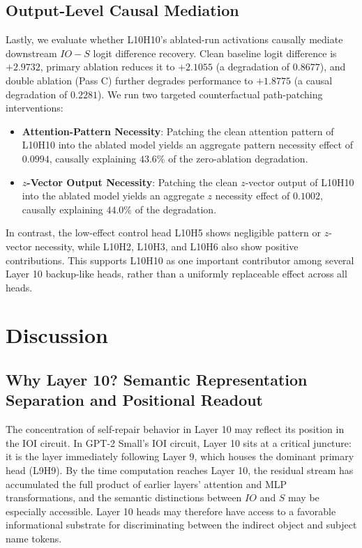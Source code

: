 \documentclass[10pt]{article} %
\begin{document}
\subsection{Output-Level Causal Mediation}
Lastly, we evaluate whether L10H10's ablated-run activations causally mediate downstream $IO - S$ logit difference recovery. Clean baseline logit difference is $+2.9732$, primary ablation reduces it to $+2.1055$ (a degradation of $0.8677$), and double ablation (Pass C) further degrades performance to $+1.8775$ (a causal degradation of $0.2281$).
We run two targeted counterfactual path-patching interventions:
\begin{itemize}
  \item \textbf{Attention-Pattern Necessity}: Patching the clean attention pattern of L10H10 into the ablated model yields an aggregate pattern necessity effect of $0.0994$, causally explaining $43.6\%$ of the zero-ablation degradation.
  \item \textbf{$z$-Vector Output Necessity}: Patching the clean $z$-vector output of L10H10 into the ablated model yields an aggregate $z$ necessity effect of $0.1002$, causally explaining $44.0\%$ of the degradation.
\end{itemize}
In contrast, the low-effect control head L10H5 shows negligible pattern or $z$-vector necessity, while L10H2, L10H3, and L10H6 also show positive contributions. This supports L10H10 as one important contributor among several Layer 10 backup-like heads, rather than a uniformly replaceable effect across all heads.

\section{Discussion}
\label{sec:discussion}

\subsection{Why Layer 10? Semantic Representation Separation and Positional Readout}
\label{subsec:layer10}

The concentration of self-repair behavior in Layer 10 may reflect its position in the IOI circuit. In GPT-2 Small's IOI circuit, Layer 10 sits at a critical
juncture: it is the layer immediately following Layer 9, which houses the
dominant primary head (L9H9). By the time computation reaches Layer 10, the
residual stream has accumulated the full product of earlier layers' attention
and MLP transformations, and the semantic distinctions between $IO$ and $S$ may be especially accessible. Layer 10 heads may therefore have access to a favorable informational substrate for discriminating between the indirect object
and subject name tokens.
\end{document}
